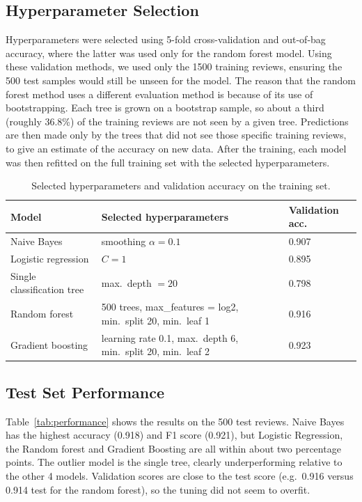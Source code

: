\documentclass{article}
\begin{document}
\subsection{Hyperparameter Selection}

Hyperparameters were selected using 5-fold cross-validation and out-of-bag accuracy, where the latter was used only for the random forest model. Using these validation methods, we used only the 1500 training reviews, ensuring the 500 test samples would still be unseen for the model. The reason that the random forest method uses a different evaluation method is because of its use of bootstrapping. Each tree is grown on a bootstrap sample, so about a third (roughly 36.8\%) of the training reviews are not seen by a given tree. Predictions are then made only by the trees that did not see those specific training reviews, to give an estimate of the accuracy on new data. After the training, each model was then refitted on the full training set with the selected hyperparameters.

\begin{table}[H]
\centering
\small
\caption{Selected hyperparameters and validation accuracy on the training set.}
\label{tab:hyperparams}
\begin{tabular}{lll}
\hline
Model & Selected hyperparameters & Validation acc.\\
\hline
Naive Bayes & smoothing $\alpha = 0.1$ & 0.907 \\
Logistic regression & $C = 1$ & 0.895 \\
Single classification tree & max.\ depth $= 20$ & 0.798 \\
Random forest & 500 trees, max\_features = log2, min.\ split 20, min.\ leaf 1 & 0.916 \\
Gradient boosting & learning rate 0.1, max.\ depth 6, min.\ split 20, min.\ leaf 2 & 0.923 \\
\hline
\end{tabular}
\end{table}

\subsection{Test Set Performance}

Table~\ref{tab:performance} shows the results on the 500 test reviews. Naive Bayes has the highest accuracy (0.918) and F1 score (0.921), but Logistic Regression, the Random forest and Gradient Boosting are all within about two percentage points. The outlier model is the single tree, clearly underperforming relative to the other 4 models. Validation scores are close to the test score (e.g.\ 0.916 versus 0.914 test for the random forest), so the tuning did not seem to overfit. 
\end{document}
